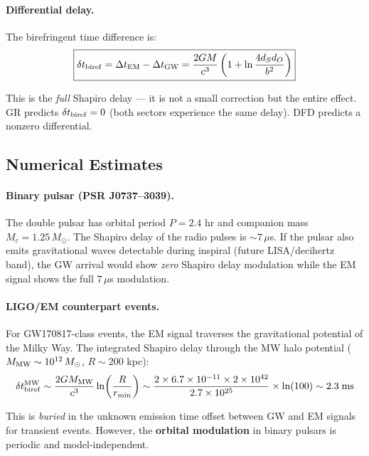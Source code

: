 \documentclass[11pt]{article}
\begin{document}
\paragraph{Differential delay.} The birefringent time difference is:
\begin{equation}
\boxed{\delta t_{\rm biref} = \Delta t_{\rm EM} - \Delta t_{\rm GW}
= \frac{2GM}{c^3}\left(1 + \ln\frac{4d_S d_O}{b^2}\right)}
\end{equation}

This is the \emph{full} Shapiro delay --- it is not a small correction but the
entire effect. GR predicts $\delta t_{\rm biref} = 0$ (both sectors experience
the same delay). DFD predicts a nonzero differential.

\subsection{Numerical Estimates}

\paragraph{Binary pulsar (PSR J0737--3039).} The double pulsar has orbital period
$P = 2.4$ hr and companion mass $M_c = 1.25\,M_\odot$. The Shapiro delay of the
radio pulses is $\sim 7\,\mu$s. If the pulsar also emits gravitational waves
detectable during inspiral (future LISA/decihertz band), the GW arrival would
show \emph{zero} Shapiro delay modulation while the EM signal shows the full
$7\,\mu$s modulation.

\paragraph{LIGO/EM counterpart events.} For GW170817-class events, the EM signal
traverses the gravitational potential of the Milky Way. The integrated Shapiro delay
through the MW halo potential ($M_{\rm MW} \sim 10^{12}\,M_\odot$, $R \sim 200$ kpc):
\begin{equation}
\delta t_{\rm biref}^{\rm MW} \sim \frac{2G M_{\rm MW}}{c^3}\ln\!\left(\frac{R}{r_{\rm min}}\right)
\sim \frac{2 \times 6.7 \times 10^{-11} \times 2 \times 10^{42}}{2.7 \times 10^{25}}
\times \ln(100)
\sim 2.3\;\text{ms}
\end{equation}

This is \emph{buried} in the unknown emission time offset between GW and EM signals
for transient events. However, the \textbf{orbital modulation} in binary pulsars is
periodic and model-independent.
\end{document}
